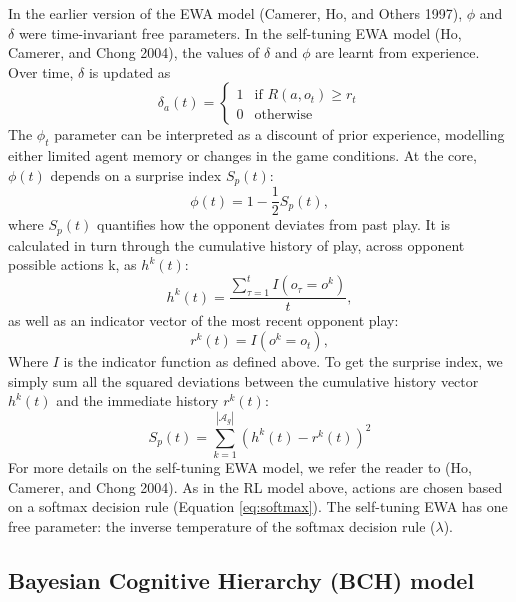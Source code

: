 \documentclass[smallextended]{svjour3}       %
\begin{document}
In the earlier version of the EWA model (Camerer, Ho, and Others 1997),
\(\phi\) and \(\delta\) were time-invariant free parameters. In the
self-tuning EWA model (Ho, Camerer, and Chong 2004), the values of
\(\delta\) and \(\phi\) are learnt from experience. Over time,
\(\delta\) is updated as
\[\delta_{a}(t) = \begin{cases} 1 & \text{if }  R(a,o_{t}) \geq r_{t}  \\
0 & \text{otherwise} \end{cases}\] The \(\phi_{t}\) parameter can be
interpreted as a discount of prior experience, modelling either limited
agent memory or changes in the game conditions. At the core, \(\phi(t)\)
depends on a surprise index \(S_{p}(t)\):
\[\phi(t) = 1 - \frac{1}{2}S_{p}(t) ,\] where \(S_{p}(t)\) quantifies
how the opponent deviates from past play. It is calculated in turn
through the cumulative history of play, across opponent possible actions
k, as \(h^{k}(t)\):
\[h^{k}(t)= \frac{ \sum_{\tau = 1}^t  I( o_{\tau} = o^k )} {t}, \] as
well as an indicator vector of the most recent opponent play:
\[r^k(t) = I(o^k=o_{t}), \] Where \(I\) is the indicator function as
defined above. To get the surprise index, we simply sum all the squared
deviations between the cumulative history vector \(h^{k}(t)\) and the
immediate history \(r^k(t)\):
\[S_{p}(t) = \sum_{k=1}^{|\mathcal{A}_g|} (h^{k}(t) - r^k(t))^2 \] For
more details on the self-tuning EWA model, we refer the reader to (Ho,
Camerer, and Chong 2004). As in the RL model above, actions are chosen
based on a softmax decision rule (Equation \ref{eq:softmax}). The
self-tuning EWA has one free parameter: the inverse temperature of the
softmax decision rule (\(\lambda\)).

\hypertarget{bayesian-cognitive-hierarchy-bch-model}{%
\subsection{Bayesian Cognitive Hierarchy (BCH)
model}\label{bayesian-cognitive-hierarchy-bch-model}}
\end{document}
